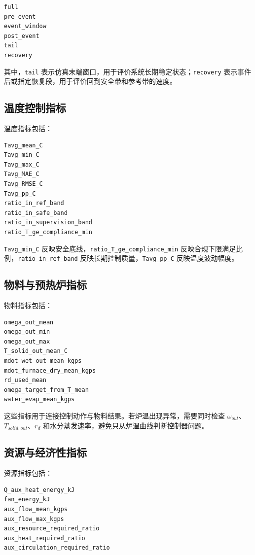 \documentclass[UTF8,openany,zihao=-4,oneside]{ctexbook}
\providecommand{\passthrough}[1]{#1}
\begin{document}
\begin{lstlisting}
full
pre_event
event_window
post_event
tail
recovery
\end{lstlisting}

其中，\passthrough{\lstinline!tail!} 表示仿真末端窗口，用于评价系统长期稳定状态；\passthrough{\lstinline!recovery!} 表示事件后或指定恢复段，用于评价回到安全带和参考带的速度。

\subsection{温度控制指标}\label{subsec:temperature-metrics}

温度指标包括：

\begin{lstlisting}
Tavg_mean_C
Tavg_min_C
Tavg_max_C
Tavg_MAE_C
Tavg_RMSE_C
Tavg_pp_C
ratio_in_ref_band
ratio_in_safe_band
ratio_in_supervision_band
ratio_T_ge_compliance_min
\end{lstlisting}

\passthrough{\lstinline!Tavg_min_C!} 反映安全底线，\passthrough{\lstinline!ratio_T_ge_compliance_min!} 反映合规下限满足比例，\passthrough{\lstinline!ratio_in_ref_band!} 反映长期控制质量，\passthrough{\lstinline!Tavg_pp_C!} 反映温度波动幅度。

\subsection{物料与预热炉指标}\label{subsec:preheater-metrics}

物料指标包括：

\begin{lstlisting}
omega_out_mean
omega_out_min
omega_out_max
T_solid_out_mean_C
mdot_wet_out_mean_kgps
mdot_furnace_dry_mean_kgps
rd_used_mean
omega_target_from_T_mean
water_evap_mean_kgps
\end{lstlisting}

这些指标用于连接控制动作与物料结果。若炉温出现异常，需要同时检查 \(\omega_{out}\)、\(T_{solid,out}\)、\(r_d\) 和水分蒸发速率，避免只从炉温曲线判断控制器问题。

\subsection{资源与经济性指标}\label{subsec:resource-metrics}

资源指标包括：

\begin{lstlisting}
Q_aux_heat_energy_kJ
fan_energy_kJ
aux_flow_mean_kgps
aux_flow_max_kgps
aux_resource_required_ratio
aux_heat_required_ratio
aux_circulation_required_ratio
\end{lstlisting}
\end{document}
